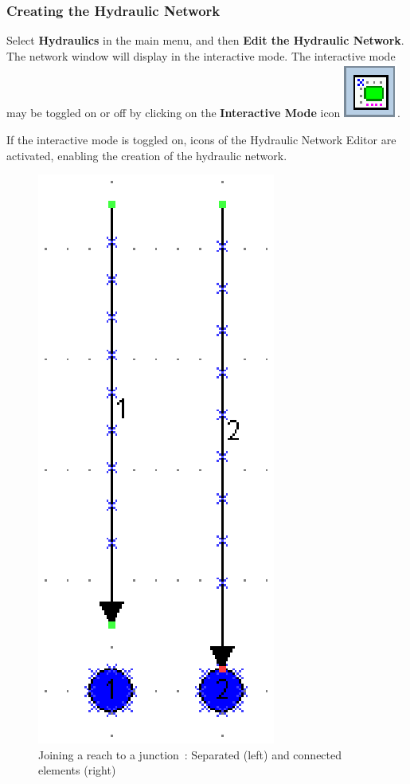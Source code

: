 \documentclass[a4paper,12pt]{article}
\begin{document}
\subsubsection{Creating the Hydraulic Network}

\hspace{0.5cm} Select \textbf{Hydraulics} in the main menu, and then \textbf{Edit the Hydraulic Network}. The
network window will display in the interactive mode. The interactive
mode may be toggled on or off by clicking on the \textbf{Interactive
Mode} icon \includegraphics[scale=0.6]{edit_nw}.

\vspace{0.5cm}

If the interactive mode is toggled on, icons of the Hydraulic Network Editor are activated, enabling the creation of the hydraulic network. 

\begin{figure}[h]
  \begin{center}
  \includegraphics[scale=0.5]{create_junction}
  \caption{Joining a reach to a junction~: Separated (left) and connected elements (right)}
  \label{fig:Joining-a-reach}
  \end{center}
\end{figure}
\end{document}
